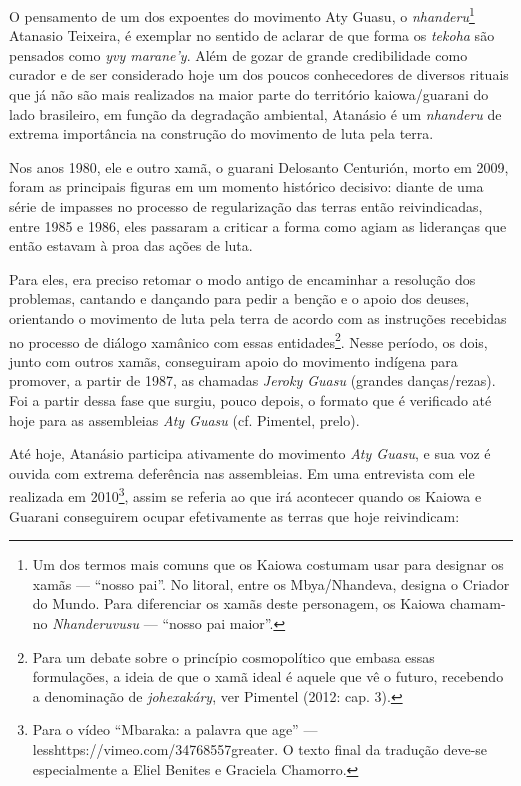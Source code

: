 O pensamento de um dos expoentes do movimento Aty Guasu, o
\emph{nhanderu}\footnote{Um dos termos mais comuns que os Kaiowa costumam usar
para designar os xamãs --- ``nosso pai''. No litoral, entre os
Mbya/Nhandeva, designa o Criador do Mundo. Para diferenciar os xamãs
deste personagem, os Kaiowa chamam-no \emph{Nhanderuvusu} --- ``nosso pai
maior''.} Atanasio Teixeira, é exemplar no sentido de aclarar de que
forma os \emph{tekoha} são pensados como \emph{yvy marane’y}. Além de gozar de grande
credibilidade como curador e de ser considerado hoje um dos poucos
conhecedores de diversos rituais que já não são mais realizados na
maior parte do território kaiowa/guarani do lado brasileiro, em função
da degradação ambiental, Atanásio é um \emph{nhanderu} de extrema importância
na construção do movimento de luta pela terra. 

Nos anos 1980, ele e outro xamã, o guarani Delosanto Centurión, morto em
2009, foram as principais figuras em um momento histórico decisivo:
diante de uma série de impasses no processo de regularização das terras
então reivindicadas, entre 1985 e 1986, eles passaram a criticar a
forma como agiam as lideranças que então estavam à proa das ações de
luta.

Para eles, era preciso retomar o modo antigo de encaminhar a resolução
dos problemas, cantando e dançando para pedir a benção e o apoio dos
deuses, orientando o movimento de luta pela terra de acordo com as
instruções recebidas no processo de diálogo xamânico com essas
entidades\footnote{Para um debate sobre o princípio cosmopolítico que
embasa essas formulações, a ideia de que o xamã ideal é aquele que vê o
futuro, recebendo a denominação de \emph{johexakáry}, ver Pimentel (2012: cap.
3).}. Nesse período, os dois, junto com outros xamãs, conseguiram apoio
do movimento indígena para promover, a partir de 1987, as chamadas
\emph{Jeroky Guasu} (grandes danças/rezas). Foi a partir dessa fase que
surgiu, pouco depois, o formato que é verificado até hoje para as
assembleias \emph{Aty Guasu} (cf. Pimentel, prelo).

Até hoje, Atanásio participa ativamente do movimento \emph{Aty Guasu}, e sua
voz é ouvida com extrema deferência nas assembleias. Em uma entrevista
com ele realizada em 2010\footnote{Para o vídeo ``Mbaraka: a palavra que
age'' --- {less}https://vimeo.com/34768557{greater}. O texto
final da tradução deve-se especialmente a Eliel Benites e Graciela
Chamorro.}, assim se referia ao que irá acontecer quando os Kaiowa e
Guarani conseguirem ocupar efetivamente as terras que hoje reivindicam:

